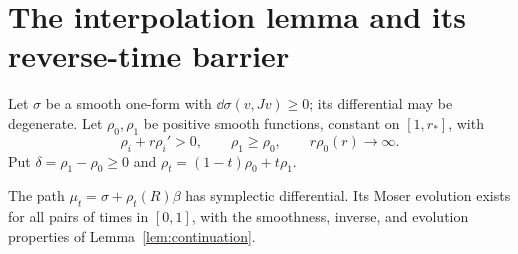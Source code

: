 \section{The interpolation lemma and its reverse-time barrier}
Let $\sigma$ be a smooth one-form with
$\dd\sigma(v,Jv)\ge0$; its differential may be degenerate.
Let $\rho_0,\rho_1$ be positive smooth functions, constant on
$[1,r_*]$, with
\begin{equation}\label{eq:bridgehyp}
 \rho_i+r\rho_i'>0,\qquad
 \rho_1\ge\rho_0,\qquad r\rho_0(r)\longrightarrow\infty.
\end{equation}
Put $\delta=\rho_1-\rho_0\ge0$ and
$\rho_t=(1-t)\rho_0+t\rho_1$.

\begin{lemma}\label{lem:bridge}
The path $\mu_t=\sigma+\rho_t(R)\beta$ has symplectic differential.
Its Moser evolution exists for all pairs of times in $[0,1]$,
with the smoothness, inverse, and evolution properties of
Lemma~\ref{lem:continuation}.
\end{lemma}
